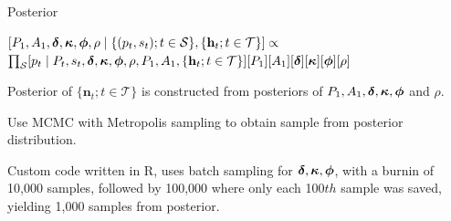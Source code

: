 \documentclass[mathserif,compress]{beamer}
\def\bh{\mathbf{h}}
\def\bn{\mathbf{n}}
\def\bdelta{\mbox{\boldmath $\delta$}}
\def\bphi{\mbox{\boldmath $\phi$}}
\def\bkappa{\mbox{\boldmath $\kappa$}}
\begin{document}
\begin{frame} 

Posterior
\begin{center}
$[P_{1},A_{1},\bdelta,\bkappa,\bphi,\rho \mid \{(p_{t},s_{t}); t \in \mathcal{S}\},\{\bh_{t}; t \in \mathcal{T}\}] \propto$ \\
$\prod_{\mathcal{S}}[p_{t} \mid P_{t}, s_{t},\bdelta,\bkappa,\bphi,\rho,P_{1},A_{1},\{\bh_{t}; t \in \mathcal{T}\}][P_{1}][A_{1}][\bdelta][\bkappa][\bphi][\rho]${}
\end{center}

Posterior of $\{\bn_{t}; t \in \mathcal{T}\}$ is constructed from posteriors of $P_{1},A_{1},\bdelta,\bkappa,\bphi$ and $\rho$. 

\vspace{.2cm}
Use MCMC with Metropolis sampling to obtain sample from posterior distribution.

\vspace{.2cm}
Custom code written in R, uses batch sampling for $\bdelta,\bkappa,\bphi$, with a burnin of 10,000 samples, followed by 100,000 where only each 100$th$ sample was saved, yielding 1,000 samples from posterior. 
\end{frame}


\end{document}
